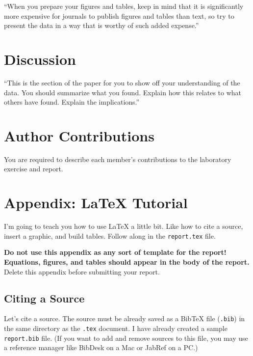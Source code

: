 \documentclass[10pt,twocolumn]{article}
\begin{document}
``When you prepare your figures and tables, keep in mind that it is significantly more expensive for journals to publish figures and tables than text, so try to present the data in a way that is worthy of such added expense.''

\section{Discussion}

``This is the section of the paper for you to show off your understanding of the data. You should summarize what you found. Explain how this relates to what others have found. Explain the implications.''

\section{Author Contributions}

You are required to describe each member's contributions to the laboratory exercise and report.






\appendix

\section{Appendix: \LaTeX{} Tutorial}\label{sec:latex}

I'm going to teach you how to use \LaTeX{} a little bit. Like how to cite a source, insert a graphic, and build tables. Follow along in the \texttt{report.tex} file.

{\bfseries\color{red} Do not use this appendix as any sort of template for the report! Equations, figures, and tables should appear in the body of the report.} Delete this appendix before submitting your report.

\subsection{Citing a Source}

Let's cite a source. The source must be already saved as a BibTeX file (\texttt{.bib}) in the same directory as the \texttt{.tex} document. I have already created a sample \texttt{report.bib} file. (If you want to add and remove sources to this file, you may use a reference manager like BibDesk on a Mac or JabRef on a PC.)
\end{document}

